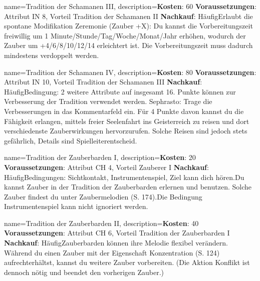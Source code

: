 {
    name={Tradition der Schamanen III},
    description={\textbf{Kosten}: 60 \textbf{Voraussetzungen}: Attribut IN 8, Vorteil Tradition der Schamanen II \textbf{Nachkauf}: Häufig\newline Erlaubt die spontane Modifikation Zeremonie (Zauber +X): Du kannst die Vorbereitungszeit freiwillig um 1 Minute/Stunde/Tag/Woche/Monat/Jahr erhöhen, wodurch der Zauber um +4/6/8/10/12/14 erleichtert ist. Die Vorbereitungszeit muss dadurch mindestens verdoppelt werden.}
}


{
    name={Tradition der Schamanen IV},
    description={\textbf{Kosten}: 80 \textbf{Voraussetzungen}: Attribut IN 10, Vorteil Tradition der Schamanen III \textbf{Nachkauf}: Häufig\newline Bedingung: 2 weitere Attribute auf insgesamt 16. Punkte können zur Verbesserung der Tradition verwendet werden. Sephrasto: Trage die Verbesserungen in das Kommentarfeld ein. Für 4 Punkte davon kannst du die Fähigkeit erlangen, mittels freier Seelenfahrt ins Geisterreich zu reisen und dort verschiedenste Zauberwirkungen hervorzurufen. Solche Reisen sind jedoch stets gefährlich, Details sind Spielleiterentscheid.}
}


{
    name={Tradition der Zauberbarden I},
    description={\textbf{Kosten}: 20 \textbf{Voraussetzungen}: Attribut CH 4, Vorteil Zauberer I \textbf{Nachkauf}: Häufig\newline Bedingungen: Sichtkontakt, Instrumentenspiel, Ziel kann dich hören.\newline Du kannst Zauber in der Tradition der Zauberbarden erlernen und benutzen. Solche Zauber findest du unter Zaubermelodien (S. 174).\newline Die Bedingung Instrumentenspiel kann nicht ignoriert werden.}
}


{
    name={Tradition der Zauberbarden II},
    description={\textbf{Kosten}: 40 \textbf{Voraussetzungen}: Attribut CH 6, Vorteil Tradition der Zauberbarden I \textbf{Nachkauf}: Häufig\newline Zauberbarden können ihre Melodie flexibel verändern. Während du einen Zauber mit der Eigenschaft Konzentration (S. 124) aufrechterhältst, kannst du weitere Zauber vorbereiten. (Die Aktion Konflikt ist dennoch nötig und beendet den vorherigen Zauber.)}
}


